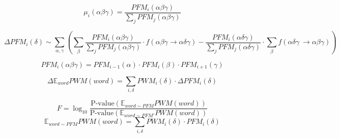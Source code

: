 \documentclass[a4paper]{article}
\begin{document}
	\begin{equation*}
	\mu_i(\alpha\beta\gamma) = \frac{PFM_i(\alpha\beta\gamma)}{\sum_j PFM_j(\alpha\beta\gamma)}
	\end{equation*}
	
	\begin{equation*}
	\Delta PFM_i(\delta) \sim \sum_{\alpha,\gamma}\left(\sum_{\beta}\frac{PFM_i(\alpha\beta\gamma)}{\sum_j PFM_j(\alpha\beta\gamma)}\cdot f(\alpha\beta\gamma \to \alpha\delta\gamma) - \frac{PFM_i(\alpha\delta\gamma)}{\sum_j PFM_j(\alpha\delta\gamma)}\cdot\sum_{\beta}f(\alpha\delta\gamma\ \to \alpha\beta\gamma)\right)
	\end{equation*}

	\begin{equation*}
	PFM_i(\alpha\beta\gamma) = PFM_{i-1}(\alpha)\cdot PFM_{i}(\beta)\cdot PFM_{i+1}(\gamma)
	\end{equation*}

	\begin{equation*}
	\Delta\mathbb{E}_{word} PWM(word) = \sum_{i,\delta} PWM_i(\delta)\cdot\Delta{PFM}_i(\delta)
	\end{equation*}


	\begin{equation*}
		F = \log_{10}\frac{\mbox{P-value}(\mathbb{E}_{word\sim PFM}PWM(word))}{\mbox{P-value}(\mathbb{E}_{word\sim PFM'}PWM(word))}
	\end{equation*}
	\begin{equation*}
		\mathbb{E}_{word\sim PFM} PWM(word) = \sum_{i,\delta} PWM_i(\delta)\cdot PFM_i(\delta)
	\end{equation*}
\end{document}
